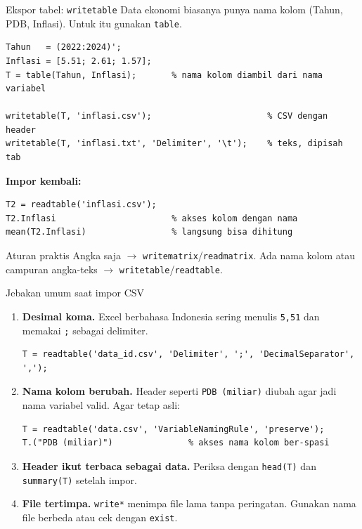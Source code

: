 \documentclass[10pt,aspectratio=169]{beamer}
\newcommand{\kode}[1]{\texttt{\small #1}}
\begin{document}
\begin{frame}[fragile]{Ekspor tabel: \kode{writetable}}
  Data ekonomi biasanya punya \alert{nama kolom} (Tahun, PDB, Inflasi). Untuk itu gunakan \kode{table}.
\begin{lstlisting}
Tahun   = (2022:2024)';
Inflasi = [5.51; 2.61; 1.57];
T = table(Tahun, Inflasi);       % nama kolom diambil dari nama variabel

writetable(T, 'inflasi.csv');                       % CSV dengan header
writetable(T, 'inflasi.txt', 'Delimiter', '\t');    % teks, dipisah tab
\end{lstlisting}
  \textbf{Impor kembali:}
\begin{lstlisting}
T2 = readtable('inflasi.csv');
T2.Inflasi                       % akses kolom dengan nama
mean(T2.Inflasi)                 % langsung bisa dihitung
\end{lstlisting}
  \begin{block}{Aturan praktis}
    \small Angka saja $\rightarrow$ \kode{writematrix}/\kode{readmatrix}. \quad
    Ada nama kolom atau campuran angka-teks $\rightarrow$ \kode{writetable}/\kode{readtable}.
  \end{block}
\end{frame}

\begin{frame}[fragile]{Jebakan umum saat impor CSV}
  \begin{enumerate}
    \item \textbf{Desimal koma.} Excel berbahasa Indonesia sering menulis \kode{5,51} dan memakai \kode{;} sebagai delimiter.
\begin{lstlisting}
T = readtable('data_id.csv', 'Delimiter', ';', 'DecimalSeparator', ',');
\end{lstlisting}
    \item \textbf{Nama kolom berubah.} Header seperti \kode{PDB (miliar)} diubah agar jadi nama variabel valid. Agar tetap asli:
\begin{lstlisting}
T = readtable('data.csv', 'VariableNamingRule', 'preserve');
T.("PDB (miliar)")               % akses nama kolom ber-spasi
\end{lstlisting}
    \item \textbf{Header ikut terbaca sebagai data.} Periksa dengan \kode{head(T)} dan \kode{summary(T)} setelah impor.
    \item \textbf{File tertimpa.} \kode{write*} menimpa file lama \alert{tanpa peringatan}. Gunakan nama file berbeda atau cek dengan \kode{exist}.
  \end{enumerate}
\end{frame}
\end{document}
